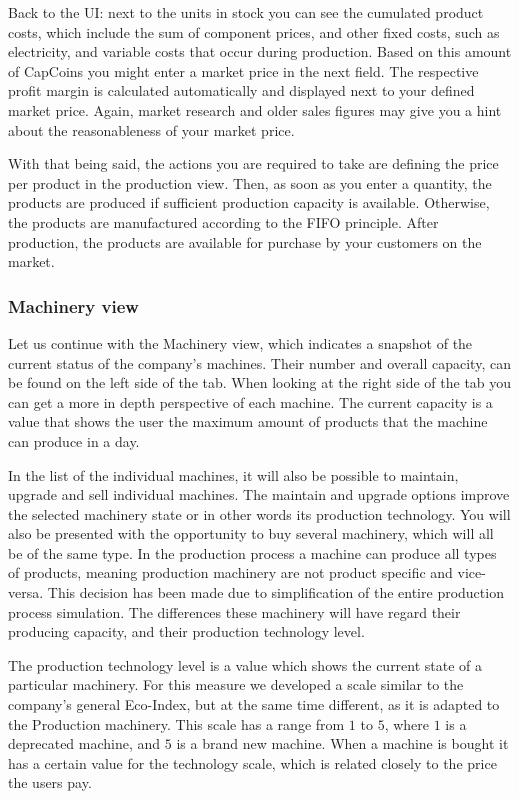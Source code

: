 Back to the UI: next to the units in stock you can see the cumulated product costs, which include the sum of component prices, and other fixed costs, such as electricity, and variable costs that occur during production. Based on this amount of CapCoins you might enter a market price in the next field. The respective profit margin is calculated automatically and displayed next to your defined market price. Again, market research and older sales figures may give you a hint about the reasonableness of your market price. 

With that being said, the actions you are required to take are defining the price per product in the production view. Then, as soon as you enter a quantity, the products are produced if sufficient production capacity is available. Otherwise, the products are manufactured according to the FIFO principle. After production, the products are available for purchase by your customers on the market.

\subsubsection{Machinery view} 
\label{sub:MachineryView}
Let us continue with the Machinery view, which indicates a snapshot of the current status of the company's machines. Their number and overall capacity, can be found on the left side of the tab. When looking at the right side of the tab you can get a more in depth perspective of each machine. The current capacity is a value that shows the user the maximum amount of products that the machine can produce in a day. 

 In the list of the individual machines, it will also be possible to maintain, upgrade and sell individual machines. The maintain and upgrade options improve the selected machinery state or in other words its production technology. 
You will also be presented with the opportunity to buy several machinery, which will all be of the same type. In the production process a machine can produce all types of products, meaning production machinery are not product specific and vice-versa. This decision has been made due to simplification of the entire production process simulation. The differences these machinery will have regard their producing capacity, and their production technology level. 

The production technology level is a value which shows the current state of a particular machinery. For this measure we developed a scale similar to the company’s general Eco-Index, but at the same time different, as it is adapted to the Production machinery.  This scale has a range from $1$ to $5$, where $1$ is a deprecated machine, and $5$ is a brand new machine. When a machine is bought it has a certain value for the technology scale, which is related closely to the price the users pay. 

